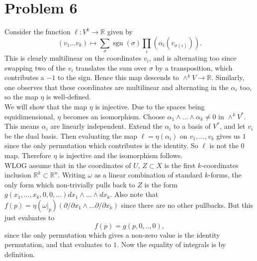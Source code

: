 \documentclass{amsart}
\numberwithin{equation}{section}
\theoremstyle{plain}
\theoremstyle{definition}
\theoremstyle{remark}
\renewcommand{\_}[2]{\underbrace{#1}_{#2}}
\renewcommand{\^}[2]{\overbrace{#1}_{#2}}
\newcommand{\R}{\mathbb{R}}
\newcommand{\sgn}{\operatorname{sgn}}
\begin{document}
\section*{Problem 6}

Consider the function $\ell: V^k \to \R$ given by \[(v_1 \dots v_k) \mapsto \sum_\sigma \sgn(\sigma) \prod_i (\alpha_i(v_{\sigma(i)})).\] This is clearly multilinear on the coordinates $v_i$, and is alternating too since swapping two of the $v_i$ translates the sum over $\sigma$ by a transposition, which contributes a $-1$ to the sign. Hence this map descends to $\wedge^k V \to \R$. Similarly, one observes that these coordinates are multilinear and alternating in the $\alpha_i$ too, so the map $\eta$ is well-defined.\\

We will show that the map $\eta$ is injective. Due to the spaces being equidimensional, $\eta$ becomes an isomorphism. Choose $\alpha_1 \wedge \dots \wedge \alpha_k \neq 0$ in $\wedge^kV^*$. This means $\alpha_i$ are linearly independent. Extend the $\alpha_i$ to a basis of $V^*$, and let $v_i$ be the dual basis. Then evaluating the map $\ell = \eta(\alpha_i)$ on $v_1, \dots , v_k$ gives us $1$ since the only permutation which contributes is the identity. So $\ell$ is not the $0$ map. Therefore $\eta$ is injective and the isomorphism follows.\\

WLOG assume that in the coordinates of $U$, $Z \subset X$ is the first $k$-coordinates inclusion $\R^k \subset \R^n$. Writing $\omega$ as a linear combination of standard $k$-forms, the only form which non-trivially pulls back to $Z$ is the form $g(x_1, \dots, x_k, 0, 0,...) dx_1 \wedge \dots \wedge dx_k$. Also note that $f(p) = \eta(\omega|_p) (\partial/\partial x_1 \wedge \dots \partial/\partial x_k)$ since there are no other pullbacks. But this just evaluates to \[f(p) = g(p,0,..,0),\] since the only  permutation which gives a non-zero value is the identity permutation, and that evaluates to $1$. Now the equality of integrals is by definition. 
\end{document}
